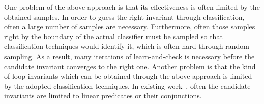 One problem of the above approach is that its effectiveness is often limited by the obtained samples. In order to guess the right invariant through classification, often a large number of samples are necessary. Furthermore, often those samples right by the boundary of the actual classifier must be sampled so that classification techniques would identify it, which is often hard through random sampling. As a result, many iterations of learn-and-check is  necessary before the candidate invariant converges to the right one. Another problem is that the kind of loop invariants which can be obtained through the above approach is limited by the adopted classification techniques. In existing work~\cite{sharma2012interpolants,DBLP:conf/sas/0001GHAN13,sharma2014invariant}, often the candidate invariants are limited to linear predicates or their conjunctions.

